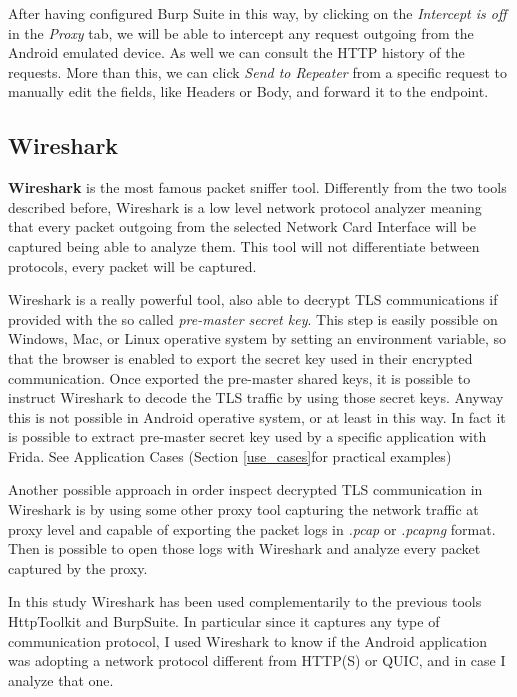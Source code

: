 			\par After having configured Burp Suite in this way, by clicking on the \textit{Intercept is off} in the \textit{Proxy} tab, we will be able to intercept any request outgoing from the Android emulated device. As well we can consult the HTTP history of the requests. More than this, we can click \textit{Send to Repeater} from a specific request to manually edit the fields, like Headers or Body, and forward it to the endpoint.
		
		\subsection{Wireshark}
		\label{sec:wireshark}
			\par \textbf{Wireshark} is the most famous packet sniffer tool. Differently from the two tools described before, Wireshark is a low level network protocol analyzer meaning that every packet outgoing from the selected Network Card Interface will be captured being able to analyze them. This tool will not differentiate between protocols, every packet will be captured. \newline
			\par Wireshark is a really powerful tool, also able to decrypt TLS communications if provided with the so called \textit{pre-master secret key}. This step is easily possible on Windows, Mac, or Linux operative system by setting an environment variable, so that the browser is enabled to export the secret key used in their encrypted communication. Once exported the pre-master shared keys, it is possible to instruct Wireshark to decode the TLS traffic by using those secret keys. Anyway this is not possible in Android operative system, or at least in this way. In fact it is possible to extract pre-master secret key used by a specific application with Frida. See Application Cases (Section \ref{use_cases}for practical examples) \newline
			\par Another possible approach in order inspect decrypted TLS communication in Wireshark is by using some other proxy tool capturing the network traffic at proxy level and capable of exporting the packet logs in \textit{.pcap} or \textit{.pcapng} format. Then is possible to open those logs with Wireshark and analyze every packet captured by the proxy.
			\par In this study Wireshark has been used complementarily to the previous tools HttpToolkit and BurpSuite. In particular since it captures any type of communication protocol, I used Wireshark to know if the Android application was adopting a network protocol different from HTTP(S) or QUIC, and in case I analyze that one.
	
